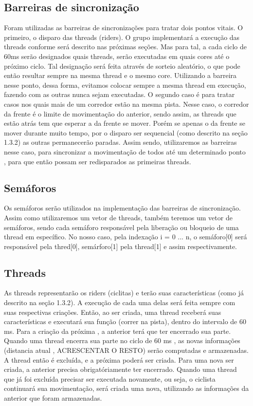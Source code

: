 \documentclass[12pt,a4paper]{article}
\begin{document}
\subsection{Barreiras de sincronização}
	Foram utilizadas as barreiras de sincronizações para tratar dois pontos vitais. O primeiro, o disparo das threads (riders). O grupo implementará a execução das threads conforme será descrito nas próximas seções. Mas para tal, a cada ciclo de 60ms serão designados quais threads, serão executadas em quais cores até o próximo ciclo. Tal designação será feita através de sorteio aleatório, o que pode então resultar sempre na mesma thread e o mesmo core. Utilizando a barreira nesse ponto, dessa forma, evitamos colocar sempre a mesma thread em execução, fazendo com as outras nunca sejam executadas.
    O segundo caso é para tratar casos nos quais mais de um corredor estão na mesma pista. Nesse caso, o corredor da frente é o limite de movimentação do anterior, sendo assim, as threads que estão atrás tem que esperar a da frente se mover. Porém se apenas o da frente se mover durante muito tempo, por o disparo ser sequencial (como descrito na seção 1.3.2) as outras permanecerão paradas. Assim sendo, utilizaremos as barreiras nesse caso, para sincronizar a movimentação de todos até um determinado ponto , para que então possam ser redisparados as primeiras threads. 

\subsection{Semáforos}

	Os semáforos serão utilizados na implementação das barreiras de sincronização. Assim como utilizaremos um vetor de threads, também teremos um vetor de semáforos, sendo cada semáforo responsável pela liberação ou bloqueio de uma thread em específico. No nosso caso, pela indexação i = 0 ... n, o semáforo[0] será responsável pela thred[0], semárforo[1] pela thread[1] e assim respectivamente. 

\subsection{Threads}

	As threads representarão os riders (ciclitas) e terão suas características (como já descrito na seção 1.3.2). A execução de cada uma delas será feita sempre com suas respectivas criações. Então, ao ser criada, uma thread receberá suas características e executará sua função (correr na pista), dentro do intervalo de 60 ms. Para a criação da próxima , a anterior terá que ter encerrado sua parte. Quando uma thread encerra sua parte no ciclo de 60 ms , as novas informações (distancia atual , ACRESCENTAR O RESTO) serão computadas e armazenadas. A thread então é excluída, e a próxima poderá ser criada. Para uma nova ser criada, a anterior precisa obrigatóriamente ter encerrado. Quando uma thread que já foi excluída precisar ser executada novamente, ou seja, o ciclista continuará sua movimentação, será criada uma nova, utilizando as informações da anterior que foram armazenadas.
\end{document}
